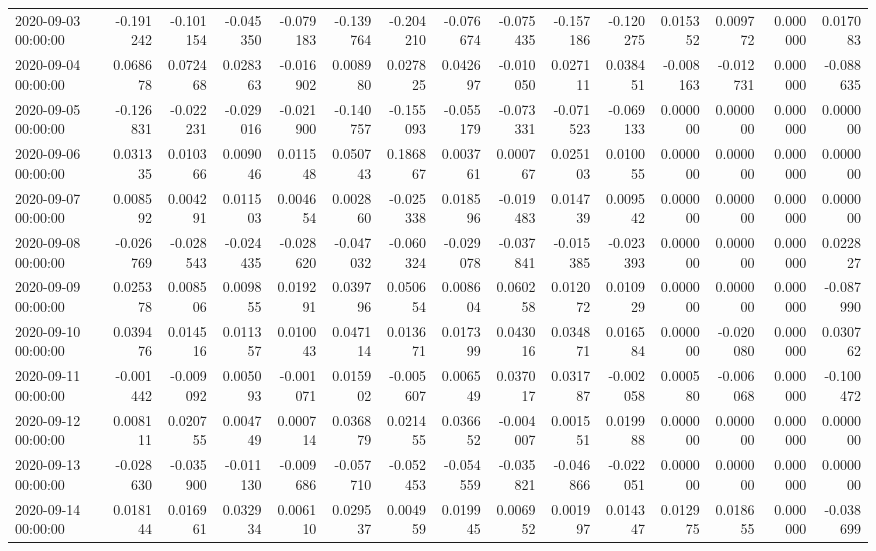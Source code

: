\begin{tabular}{lrrrrrrrrrrrrrr}
2020-09-03 00:00:00 & -0.191242 & -0.101154 & -0.045350 & -0.079183 & -0.139764 & -0.204210 & -0.076674 & -0.075435 & -0.157186 & -0.120275 & 0.015352 & 0.009772 & 0.000000 & 0.017083 \\
2020-09-04 00:00:00 & 0.068678 & 0.072468 & 0.028363 & -0.016902 & 0.008980 & 0.027825 & 0.042697 & -0.010050 & 0.027111 & 0.038451 & -0.008163 & -0.012731 & 0.000000 & -0.088635 \\
2020-09-05 00:00:00 & -0.126831 & -0.022231 & -0.029016 & -0.021900 & -0.140757 & -0.155093 & -0.055179 & -0.073331 & -0.071523 & -0.069133 & 0.000000 & 0.000000 & 0.000000 & 0.000000 \\
2020-09-06 00:00:00 & 0.031335 & 0.010366 & 0.009046 & 0.011548 & 0.050743 & 0.186867 & 0.003761 & 0.000767 & 0.025103 & 0.010055 & 0.000000 & 0.000000 & 0.000000 & 0.000000 \\
2020-09-07 00:00:00 & 0.008592 & 0.004291 & 0.011503 & 0.004654 & 0.002860 & -0.025338 & 0.018596 & -0.019483 & 0.014739 & 0.009542 & 0.000000 & 0.000000 & 0.000000 & 0.000000 \\
2020-09-08 00:00:00 & -0.026769 & -0.028543 & -0.024435 & -0.028620 & -0.047032 & -0.060324 & -0.029078 & -0.037841 & -0.015385 & -0.023393 & 0.000000 & 0.000000 & 0.000000 & 0.022827 \\
2020-09-09 00:00:00 & 0.025378 & 0.008506 & 0.009855 & 0.019291 & 0.039796 & 0.050654 & 0.008604 & 0.060258 & 0.012072 & 0.010929 & 0.000000 & 0.000000 & 0.000000 & -0.087990 \\
2020-09-10 00:00:00 & 0.039476 & 0.014516 & 0.011357 & 0.010043 & 0.047114 & 0.013671 & 0.017399 & 0.043016 & 0.034871 & 0.016584 & 0.000000 & -0.020080 & 0.000000 & 0.030762 \\
2020-09-11 00:00:00 & -0.001442 & -0.009092 & 0.005093 & -0.001071 & 0.015902 & -0.005607 & 0.006549 & 0.037017 & 0.031787 & -0.002058 & 0.000580 & -0.006068 & 0.000000 & -0.100472 \\
2020-09-12 00:00:00 & 0.008111 & 0.020755 & 0.004749 & 0.000714 & 0.036879 & 0.021455 & 0.036652 & -0.004007 & 0.001551 & 0.019988 & 0.000000 & 0.000000 & 0.000000 & 0.000000 \\
2020-09-13 00:00:00 & -0.028630 & -0.035900 & -0.011130 & -0.009686 & -0.057710 & -0.052453 & -0.054559 & -0.035821 & -0.046866 & -0.022051 & 0.000000 & 0.000000 & 0.000000 & 0.000000 \\
2020-09-14 00:00:00 & 0.018144 & 0.016961 & 0.032934 & 0.006110 & 0.029537 & 0.004959 & 0.019945 & 0.006952 & 0.001997 & 0.014347 & 0.012975 & 0.018655 & 0.000000 & -0.038699 \\

\end{tabular}
